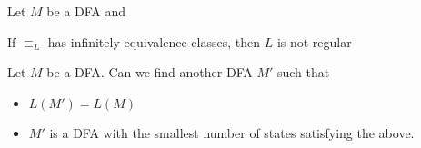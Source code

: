\begin{thm}
Let $M$ be a DFA and
\end{thm}

\begin{cor}
 If $\equiv_L$ has infinitely equivalence classes, then $L$ is not
 regular
\end{cor}




Let $M$ be a DFA. Can we find another DFA $M'$ such
that
\begin{itemize}
 \item $L(M') = L(M)$
 \item $M'$ is a DFA with the smallest number of states satisfying
 the above.
\end{itemize}


